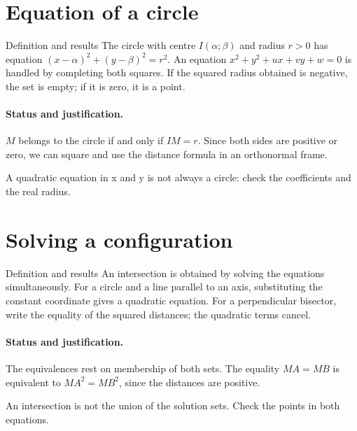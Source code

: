\section{Equation of a circle}\label{C07-U3}
\begin{repere}{Definition and results}
The circle with centre $I(\alpha;\beta)$ and radius $r>0$ has equation $(x-\alpha)^2+(y-\beta)^2=r^2$. An equation $x^2+y^2+ux+vy+w=0$ is handled by completing both squares. If the squared radius obtained is negative, the set is empty; if it is zero, it is a point.
\end{repere}
\paragraph{Status and justification.} $M$ belongs to the circle if and only if $IM=r$. Since both sides are positive or zero, we can square and use the distance formula in an orthonormal frame.
\label{C07-EX3}
\begin{erreur}A quadratic equation in x and y is not always a circle: check the coefficients and the real radius.\end{erreur}
\label{C07-AP3}
\section{Solving a configuration}\label{C07-U4}
\begin{repere}{Definition and results}
An intersection is obtained by solving the equations simultaneously. For a circle and a line parallel to an axis, substituting the constant coordinate gives a quadratic equation. For a perpendicular bisector, write the equality of the squared distances; the quadratic terms cancel.
\end{repere}
\paragraph{Status and justification.} The equivalences rest on membership of both sets. The equality $MA=MB$ is equivalent to $MA^2=MB^2$, since the distances are positive.
\label{C07-EX4}
\begin{erreur}An intersection is not the union of the solution sets. Check the points in both equations.\end{erreur}
\label{C07-AP4}
